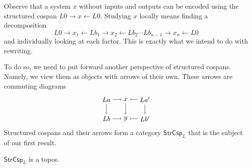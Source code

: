 \documentclass{amsart}
\newcommand{\StrCsp}{\cat{StrCsp}}
\newcommand{\cat}[1]{\mathsf{#1}}
\renewcommand{\gets}{\leftarrow}
\theoremstyle{remark}
\theoremstyle{definition}
\begin{document}
Observe that a system $ x $ without inputs and outputs can be encoded
using the structured cospan $ L0 \to x \gets L0 $.  Studying $ x $
locally means finding a decomposition
%
\[
  L0 \to x_1 \gets Lb_1 \to x_2 \gets Lb_2 \dotsm Lb_{n-1} \to x_n
  \gets L0
\]
% 
and individually looking at each factor. This is exactly what we
intend to do with rewriting.  

To do so, we need to put forward another perspective of structured
cospans.  Namely, we view them as objects with arrows of their own.
These arrows are commuting diagrams
%
\begin{equation} \label{eq:StrCsp-arrows}
\raisebox{-4.5ex}{
  \begin{tikzpicture}
    \node (1t) at (0,1) {$ La $};
    \node (2t) at (1,1) {$ x $};
    \node (3t) at (2,1) {$ La' $};
    \node (1b) at (0,0) {$ Lb $};
    \node (2b) at (1,0) {$ y $};
    \node (3b) at (2,0) {$ Lb' $};
    \draw [->] (1t) to node [] {\scriptsize{$  $}} (2t);
    \draw [->] (3t) to node [] {\scriptsize{$  $}} (2t);
    \draw [->] (1b) to node [] {\scriptsize{$  $}} (2b);
    \draw [->] (3b) to node [] {\scriptsize{$  $}} (2b);
    \draw [->] (1t) to node [] {\scriptsize{$  $}} (1b);
    \draw [->] (2t) to node [] {\scriptsize{$  $}} (2b);
    \draw [->] (3t) to node [] {\scriptsize{$  $}} (3b);
  \end{tikzpicture}
}
\end{equation}
%
Structured cospans and their arrows form a category $ \StrCsp_L $ that
is the subject of our first result.

\begin{theorem*}[\ref{thm:strcsp-istopos}]
  $ \StrCsp_L $ is a topos.
\end{theorem*}
\end{document}
